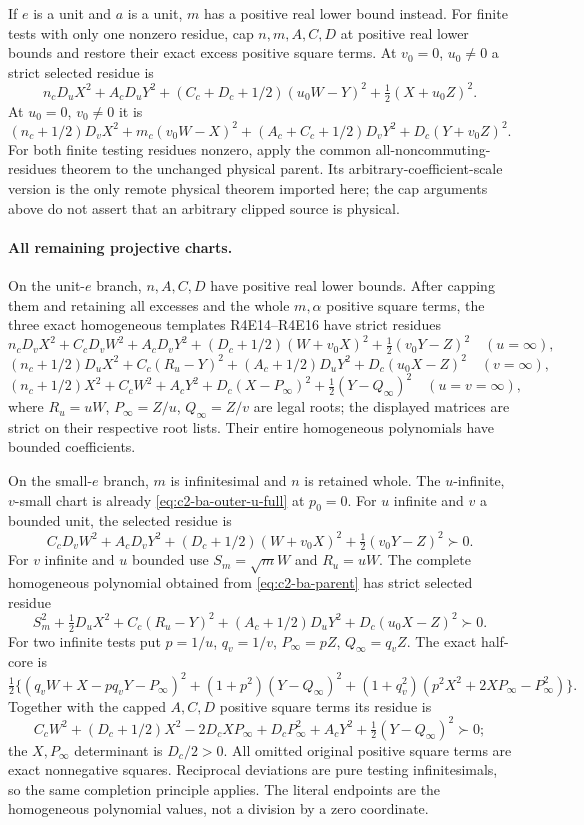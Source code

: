 If $e$ is a unit and $a$ is a unit, $m$ has a positive real lower
bound instead. For finite tests with only one nonzero residue, cap
$n,m,A,C,D$ at positive real lower bounds and restore their exact
excess positive square terms. At $v_0=0$, $u_0\ne0$ a strict selected residue is
\[
 n_cD_uX^2+A_cD_uY^2+(C_c+D_c+1/2)(u_0W-Y)^2
                         +\tfrac12(X+u_0Z)^2.
\]
At $u_0=0$, $v_0\ne0$ it is
\[
 (n_c+1/2)D_vX^2+m_c(v_0W-X)^2
 +(A_c+C_c+1/2)D_vY^2+D_c(Y+v_0Z)^2.
\]
For both finite testing residues nonzero, apply the common
all-noncommuting-residues theorem to the unchanged physical parent.
Its arbitrary-coefficient-scale version is the only remote physical
theorem imported here; the cap arguments above do not assert that
an arbitrary clipped source is physical.

\paragraph{All remaining projective charts.}
On the unit-$e$ branch, $n,A,C,D$ have positive real lower bounds.
After capping them and retaining all excesses and the whole $m,\alpha$
positive square terms, the three exact homogeneous templates R4E14--R4E16 have strict
residues
\[
 n_cD_vX^2+C_cD_vW^2+A_cD_vY^2
 +(D_c+1/2)(W+v_0X)^2+\tfrac12(v_0Y-Z)^2
 \quad(u=\infty),
\]
\[
 (n_c+1/2)D_uX^2+C_c(R_u-Y)^2+(A_c+1/2)D_uY^2
 +D_c(u_0X-Z)^2\quad(v=\infty),
\]
\[
 (n_c+1/2)X^2+C_cW^2+A_cY^2+D_c(X-P_\infty)^2
 +\tfrac12(Y-Q_\infty)^2\quad(u=v=\infty),
\]
where $R_u=uW$, $P_\infty=Z/u$, $Q_\infty=Z/v$ are legal roots;
the displayed matrices are strict on their respective root lists.
Their entire homogeneous polynomials have bounded coefficients.

On the small-$e$ branch, $m$ is infinitesimal and $n$ is retained whole.
The $u$-infinite, $v$-small chart is already
\eqref{eq:c2-ba-outer-u-full} at $p_0=0$. For $u$ infinite and $v$ a
bounded unit, the selected residue is
\[
 C_cD_vW^2+A_cD_vY^2+(D_c+1/2)(W+v_0X)^2
 +\tfrac12(v_0Y-Z)^2\succ0.
\]
For $v$ infinite and $u$ bounded use $S_m=\sqrt mW$ and $R_u=uW$.
The complete homogeneous polynomial obtained from
\eqref{eq:c2-ba-parent} has strict selected residue
\[
 S_m^2+\tfrac12D_uX^2+C_c(R_u-Y)^2
 +(A_c+1/2)D_uY^2+D_c(u_0X-Z)^2\succ0.
\]
For two infinite tests put $p=1/u$, $q_v=1/v$,
$P_\infty=pZ$, $Q_\infty=q_vZ$. The exact half-core is
\[
 \tfrac12\{(q_vW+X-pq_vY-P_\infty)^2
 +(1+p^2)(Y-Q_\infty)^2
 +(1+q_v^2)(p^2X^2+2XP_\infty-P_\infty^2)\}.
\]
Together with the capped $A,C,D$ positive square terms its residue is
\[
 C_cW^2+(D_c+1/2)X^2-2D_cXP_\infty+D_cP_\infty^2
 +A_cY^2+\tfrac12(Y-Q_\infty)^2\succ0;
\]
the $X,P_\infty$ determinant is $D_c/2>0$. All omitted original
positive square terms are exact nonnegative squares. Reciprocal deviations are pure
testing infinitesimals, so the same completion principle applies. The
literal endpoints are the homogeneous polynomial values, not a division
by a zero coordinate.

